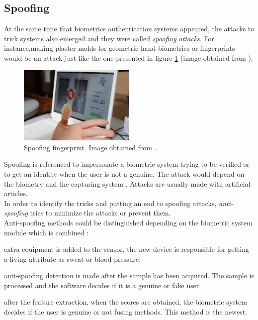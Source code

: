 \subsection{Spoofing}
At the same time that biometrics authentication systems appeared, the attacks to trick systems also emerged and they were called \textit{spoofing attacks}. For instance,making plaster molds for geometric hand biometrics or fingerprints would be an attack just like the one presented in figure \ref{fig:Spoof_fingerprint} (image obtained from \cite{fingerprint_image}).\\

\begin{figure}[htb]
\centering
\includegraphics[width=0.5\textwidth]{images_miscelaneus/spoofing_fingerprint.jpg}
\caption{Spoofing fingerprint. Image obtained from \cite{fingerprint_image}.} \label{fig:Spoof_fingerprint}
\end{figure}

Spoofing is referenced to impersonate a biometric system trying to be verified or to get an identity when the user is not a genuine. The attack would depend on the biometry and the capturing system \cite{Spoofing_survey}. Attacks are usually made with artificial articles.\\

In order to identify the tricks and putting an end to  spoofing attacks, \textit{anti-spoofing} tries to minimize the attacks or prevent them.\\


Anti-spoofing methods could be distinguished depending on the biometric system module which is combined \cite{Spoofing_survey}:
\begin{description}[itemsep=2pt,topsep=8pt,parsep=0pt,partopsep=20pt]
\item[Sensor level:] extra equipment is added to the sensor, the new device is responsible for getting a living attribute as sweat or blood pressure.
\item[Feature level:] anti-spoofing detection is made after the sample has been acquired. The sample is processed and the software decides if it is a genuine or fake user.
\item[Score level:] after the feature extraction, when the scores are obtained, the biometric system decides if the user is genuine or not fusing methods. This method is the newest.
\end{description}

